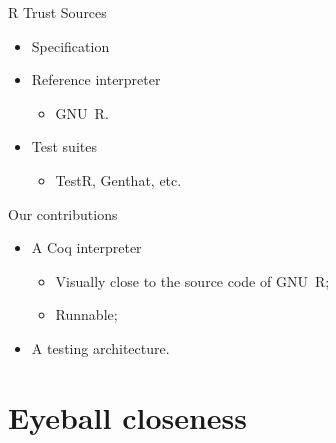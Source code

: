 \documentclass{beamer}
\newcommand{\cmark}{\ding{51}}
\newcommand{\xmark}{\ding{55}}
\begin{document}
\begin{frame}

    \begin{block}{R Trust Sources}
        \begin{changemargin}{0pt}{2cm}
    \begin{itemize}
        \item Specification \hfill \xmark
        \item Reference interpreter \hfill \cmark
           \begin{itemize}
               \item GNU~R.
           \end{itemize}
        \item Test suites \hfill \cmark
           \begin{itemize}
               \item TestR, Genthat, etc.
           \end{itemize}
    \end{itemize}
        \end{changemargin}
    \end{block}

    \begin{block}{Our contributions}
        \begin{itemize}
            \item A Coq interpreter
                \begin{itemize}
                    \item Visually close to the source code of GNU~R;
                    \item Runnable;
                \end{itemize}
            \item A testing architecture.
        \end{itemize}
    \end{block}

\end{frame}

\section{Eyeball closeness}
\end{document}
